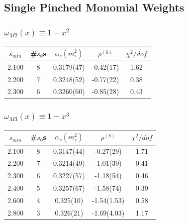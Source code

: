 \documentclass[fleqn]{beamer}
\begin{document}
\subsection{Single Pinched Monomial Weights}
\begin{frame}
  \frametitle{\(\omega_{M2}(x) \equiv 1-x^2\)}
  \centering
  \begin{tabular}{ccccc}
    \toprule
    \(s_{min}\) & \#\(s_0\)s & \(\alpha_s(m_\tau^2)\) & \(\rho^{(6)}\) &  \(\chi^2/dof\)  \\
    \midrule
    2.100 & 8 & 0.3179(47) & -0.42(17) & 1.62 \\
    \rowcolor{primary}
    2.200 & 7 & 0.3248(52) & -0.77(22) & 0.38 \\
    2.300 & 6 & 0.3260(60) & -0.85(28) & 0.43 \\
    \bottomrule
  \end{tabular}
\end{frame}
\begin{frame}
  \frametitle{\(\omega_{M3}(x) \equiv 1-x^3\)}
  \centering
  \begin{tabular}{ccccc}
    \toprule
    \(s_{min}\) & \#\(s_0\)s & \(\alpha_s(m_\tau^2)\) & \(\rho^{(8)}\) &  \(\chi^2/dof\)  \\
    \midrule
    2.100 & 8 & 0.3147(44) & -0.27(29) & 1.71 \\
    \rowcolor{primary}
    2.200 & 7  & 0.3214(49) & -1.01(39) & 0.41 \\
    2.300 & 6  & 0.3227(57) & -1.18(54) & 0.46 \\
    2.400 & 5  & 0.3257(67) & -1.58(74) & 0.39 \\
    2.600 & 4  & 0.325(10) & -1.54(1.53) & 0.58 \\
    2.800 & 3  & 0.326(21) & -1.69(4.03) & 1.17 \\
    \bottomrule
  \end{tabular}
\end{frame}
\end{document}
